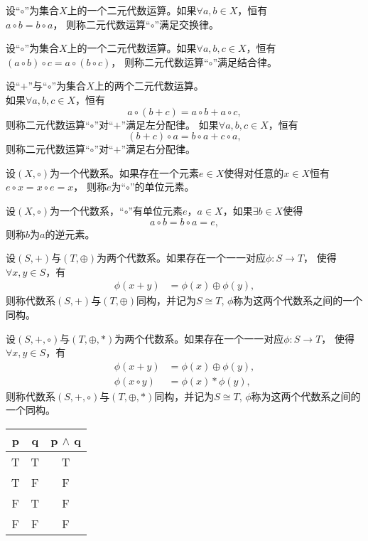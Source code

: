   \begin{Def}
    设“$\circ$”为集合$X$上的一个二元代数运算。如果$\forall a, b \in X$，恒有\\$a \circ b = b \circ a$， 则称二元代数运算“$\circ$”满足交换律。
  \end{Def}
  \begin{Def}
    设“$\circ$”为集合$X$上的一个二元代数运算。如果$\forall a, b, c \in X$，恒有$(a \circ b) \circ c = a \circ (b \circ c)$， 则称二元代数运算“$\circ$”满足结合律。
  \end{Def}
  \begin{Def}
    设“$+$”与“$\circ$”为集合$X$上的两个二元代数运算。\\如果$\forall a, b, c \in X$，恒有\[a \circ (b + c) = a \circ b + a \circ c,\] 则称二元代数运算“$\circ$”对“$+$”满足左分配律。
    如果$\forall a, b, c \in X$，恒有\[(b + c)\circ a = b \circ a + c \circ a,\] 则称二元代数运算“$\circ$”对“$+$”满足右分配律。
  \end{Def}
  \begin{Def}
    设$(X, \circ)$为一个代数系。如果存在一个元素$e\in X$使得对任意的$x\in X$恒有$e\circ x = x \circ e = x$， 则称$e$为“$\circ$”的单位元素。
  \end{Def}
  \begin{Def}
    设$(X, \circ)$为一个代数系，“$\circ$”有单位元素$e$，$a\in X$，如果$\exists b\in X$使得\[a\circ b = b \circ a = e,\]  则称$b$为$a$的逆元素。
  \end{Def}
  \begin{Def}
    设$(S,+)$与$(T, \oplus)$为两个代数系。如果存在一个一一对应$\phi:S\to T$， 使得$\forall x, y \in S$，有
    \begin{align*}
      \phi(x+y) &= \phi(x) \oplus \phi(y),
    \end{align*}
    则称代数系$(S,+)$与$(T, \oplus)$同构，并记为$S\cong T$, $\phi$称为这两个代数系之间的一个同构。
  \end{Def}
  \begin{Def}
    设$(S,+, \circ)$与$(T, \oplus, *)$为两个代数系。如果存在一个一一对应$\phi:S\to T$， 使得$\forall x, y \in S$，有
    \begin{align*}
      \phi(x+y) &= \phi(x) \oplus \phi(y),\\
      \phi(x\circ y)&= \phi(x) * \phi(y),
    \end{align*}
    则称代数系$(S,+,\circ)$与$(T, \oplus, *)$同构，并记为$S\cong T$, $\phi$称为这两个代数系之间的一个同构。
  \end{Def}
  \begin{tabular}{cc|c}
    p& q& p $\land$ q\\
    \hline
    T&T&T\\
    T&F&F\\
    F&T&F\\
    F&F&F\\
  \end{tabular}\hspace{1cm}
